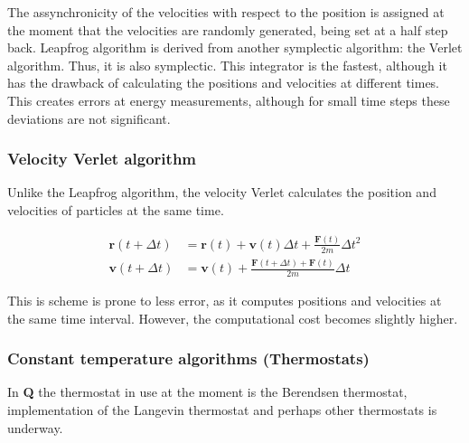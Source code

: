 \documentclass[a4paper,10pt]{article}
\begin{document}
The assynchronicity of the velocities with respect to the position is assigned 
at the moment that the velocities are randomly generated, being set at a half step 
back. Leapfrog algorithm is derived from another symplectic algorithm: the 
Verlet algorithm. Thus, it is also symplectic. This integrator is the fastest, 
although it has the drawback of calculating the positions and velocities at 
different times. This creates errors at energy measurements, although for small 
time steps these deviations are not significant.

\subsubsection{Velocity Verlet algorithm}
Unlike the Leapfrog algorithm, the velocity Verlet calculates the position and 
velocities of particles at the same time.

\begin{align}
 \textbf{r}(t+\Delta t) &= \textbf{r}(t) + \textbf{v}(t)\Delta t + \frac{\textbf{F}(t)}{2m}
\Delta t^2 \\
 \textbf{v}(t+\Delta t) &= \textbf{v}(t) + \frac{\textbf{F}(t+\Delta t) + 
\textbf{F}(t)}{2m}\Delta t
\end{align}

This is scheme is prone to less error, as it computes positions and velocities 
at the same time interval. However, the computational cost becomes slightly higher.

\subsubsection{Constant temperature algorithms (Thermostats)}
In   \textbf{Q}    the   thermostat   in    use   at   the   moment    is   the
Berendsen\cite{Berendsen:1984}   thermostat,  implementation   of  the
Langevin thermostat and perhaps other thermostats is underway.

\end{document}
